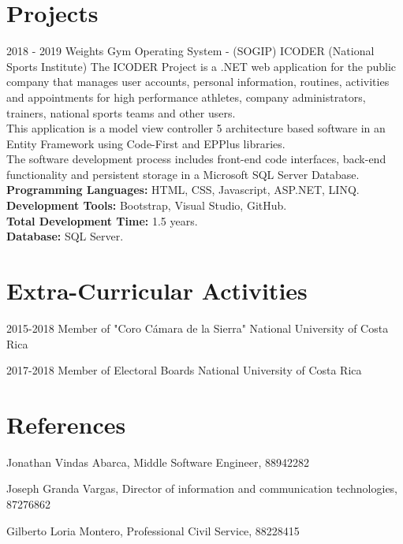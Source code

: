 \documentclass[]{friggeri-cv}
\begin{document}
\section{Projects}
\begin{entrylist}
    \entry
    {2018 - 2019}
    {Weights Gym Operating System - (SOGIP)}
    {ICODER (National Sports Institute)}
    {The ICODER Project is a .NET web application for the public company that manages user accounts, personal information, routines, activities and appointments for high performance athletes, company administrators, trainers, national sports teams and other users. \\
    This application is a model view controller 5 architecture based software in an Entity Framework using Code-First and EPPlus libraries. \\
    The software development process includes front-end code interfaces, back-end functionality and persistent storage in a Microsoft SQL Server Database. \\
    \textbf{Programming Languages:} HTML, CSS, Javascript, ASP.NET, LINQ. \\
    \textbf{Development Tools:} Bootstrap, Visual Studio, GitHub. \\
    \textbf{Total Development Time:} 1.5 years. \\
    \textbf{Database:} SQL Server. }
    
    
\end{entrylist}

\section{Extra-Curricular Activities}
\begin{entrylist}
  \entry
    {2015-2018}
    {Member of "Coro Cámara de la Sierra"}
    {National University of Costa Rica}
    
   \entry 
    {2017-2018}
    {Member of Electoral Boards}
    {National University of Costa Rica}
    
\end{entrylist}

\section{References}
\begin{entrylist}
  \entry
    {}
    {Jonathan Vindas Abarca, Middle Software Engineer, 88942282}
    {}
    
    \entry
    {}
    {Joseph Granda Vargas, Director of information and communication technologies, 87276862}
    {}
    
    \entry
    {}
    {Gilberto Loria Montero, Professional Civil Service, 88228415}
    {}
    
    
\end{entrylist}
\end{document}
